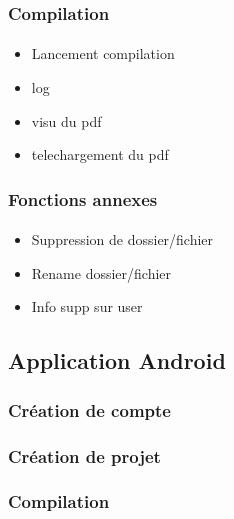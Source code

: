 \documentclass[a4paper,12pt]{article}
\begin{document}
\subsubsection{Compilation}
\paragraph*{}
\begin{itemize}
 \item Lancement compilation
 \item log
 \item visu du pdf
 \item telechargement du pdf
\end{itemize}


\subsubsection{Fonctions annexes}
\paragraph*{}
\begin{itemize}
 \item Suppression de dossier/fichier
 \item Rename dossier/fichier
 \item Info supp sur user
\end{itemize}

\subsection{Application Android}
\subsubsection{Création de compte}
\paragraph*{}

\subsubsection{Création de projet}
\paragraph*{}

\subsubsection{Compilation}
\end{document}
